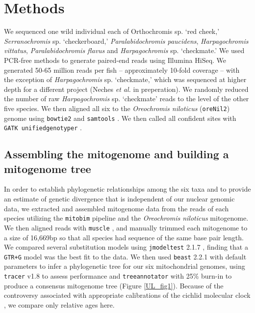 \section{Methods}

We sequenced one wild individual each of Orthochromis sp. `red cheek,' {\em Serranochromis} sp. `checkerboard,' {\em Paralabidochromis paucidens}, {\em Harpagochromis vittatus}, {\em Paralabidochromis flavus} and {\em Harpagochromis} sp. `checkmate.' We used PCR-free methods \cite{kozarewa2009amplification} to generate paired-end reads using Illumina HiSeq. We generated 50-65 million reads per fish -- approximately 10-fold coverage -- with the exception of {\em Harpagochromis} sp. `checkmate,' which was sequenced at higher depth for a different project (Neches {\em et al.} in preperation). We randomly reduced the number of raw {\em Harpagochromis} sp. `checkmate' reads to the level of the other five species. We then aligned all six to the {\em Oreochromis niloticus} ({\tt oreNil2}) genome \cite{brawand2014genomic} using {\tt bowtie2} \cite{langmead2012fast} and {\tt samtools} \cite{li2009sequence}. We then called all confident sites with {\tt GATK unifiedgenotyper} \cite{mckenna2010genome}.

\subsection{Assembling the mitogenome and building a mitogenome tree}

In order to establish phylogenetic relationships among the six taxa and to provide an estimate of genetic divergence that is independent of our nuclear genomic data, we extracted and assembled mitogenome data from the reads of each species utilizing the {\tt mitobim} \cite{hahn2013reconstructing} pipeline and the {\em Oreochromis niloticus} mitogenome. We then aligned reads with {\tt muscle} \cite{edgar2004muscle}, and manually trimmed each mitogenome to a size of 16,669bp so that all species had sequence of the same base pair length. We compared several substitution models using {\tt jmodeltest} 2.1.7 \cite{darriba2012jmodeltest}, finding that a {\tt GTR+G} model was the best fit to the data. We then used {\tt beast} 2.2.1 \cite{bouckaert2014beast} with default parameters to infer a phylogenetic tree for our six mitochondrial genomes, using {\tt tracer} v1.8 \cite{rambaut2003tracer} to assess performance and {\tt treeannotator} with 25\% burn-in to produce a consensus mitogenome tree (Figure \ref{UL_fig1}). Because of the controversy associated with appropriate calibrations of the cichlid molecular clock \cite{genner2007age, azuma2008mitogenomic, friedman2013molecular, schwarzer2015phylogeny}, we compare only relative ages here.

